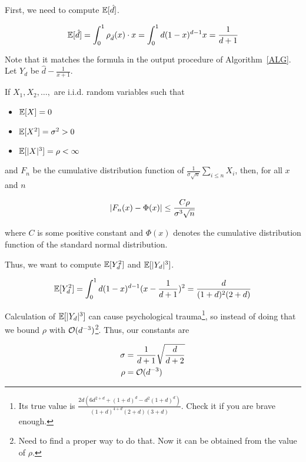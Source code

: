 First, we need to compute $\mathbb{E}[\hat d]$.

\begin{equation*}
	\mathbb{E}[\hat d] = \int_0^1 \rho_{\hat d}(x) \cdot x = \int_0^1 d (1 - x)^{d - 1} x = \frac{1}{d + 1}
\end{equation*}

Note that it matches the formula in the output procedure of Algorithm~\ref{ALG}. Let $Y_d$ be $\hat d - \frac{1}{x + 1}$.

\begin{theorem}\label{BE}
	If $X_1, X_2, \ldots, $ are i.i.d. random variables such that

	\begin{itemize}
		\item $\mathbb{E}[X] = 0$

		\item $\mathbb{E}[X^2] = \sigma^2 > 0$
		
		\item $\mathbb{E}[\lvert X\rvert^3] = \rho < \infty$
	\end{itemize}

	and $F_n$ be the cumulative distribution function of $\frac{1}{\sigma \sqrt{n}} \sum_{i \leq n} X_i$, then, for all $x$ and $n$

	\begin{equation*}
		\lvert F_n(x) - \Phi(x)\rvert \leq \frac{C \rho}{\sigma^3 \sqrt{n}}
	\end{equation*}
	
	where $C$ is some positive constant and $\Phi(x)$ denotes the cumulative distribution function of the standard normal distribution.
\end{theorem}

Thus, we want to compute $\mathbb{E}[Y_d^2]$ and $\mathbb{E}[\lvert Y_d\rvert^3]$.

\begin{equation*}
	\mathbb{E}[Y_d^2] = \int_{0}^{1} d (1 - x)^{d - 1} (x - \frac{1}{d + 1})^2 = \frac{d}{(1 + d)^2 (2 + d)}
\end{equation*}

Calculation of $\mathbb{E}[\lvert Y_d\rvert^3]$ can cause psychological trauma\footnote{Its true value is $\frac{2 d (6 d^{2 + d} + (1 + d)^d - d^2 (1 + d)^d)}{(1 + d)^{4 + d} (2 + d) (3 + d)}$. Check it if you are brave enough.}, so instead of doing that we bound $\rho$ with $\mathcal{O}(d^{-3})$\footnote{Need to find a proper way to do that. Now it can be obtained from the value of $\rho$.}. Thus, our constants are

\begin{align*}
	\sigma & = \frac{1}{d + 1}\sqrt{\frac{d}{d + 2}} \\
	\rho & = \mathcal{O}(d^{-3})
\end{align*}

